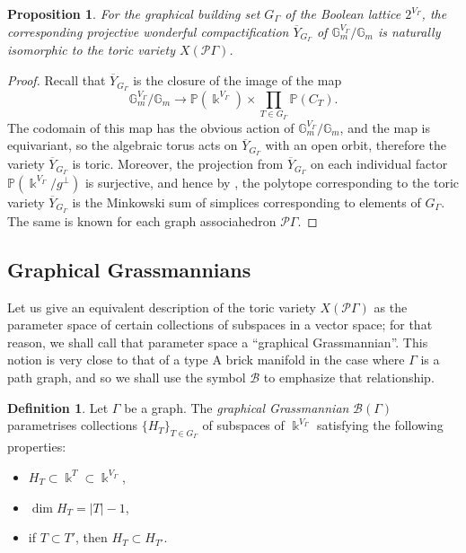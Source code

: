 \documentclass[11pt]{article}
\newtheorem{prop}[theo]{Proposition}
\theoremstyle{definition}
\newtheorem{defi}[theo]{Definition}
\numberwithin{equation}{section}
\newcommand\calB{\mathcal{B}}
\newcommand\calP{\mathcal{P}}
\newcommand\kk{\Bbbk}
\begin{document}
\begin{prop}\label{prop:wondtoric}
For the graphical building set $G_\Gamma$ of the Boolean lattice $2^{V_\Gamma}$, the corresponding projective wonderful compactification  $\overline{Y}_{G_\Gamma}$ of $\mathbb{G}_m^{V_\Gamma}/\mathbb{G}_m$ is naturally isomorphic to the toric variety $X(\calP\Gamma)$.
\end{prop}

\begin{proof}
Recall that $\overline{Y}_{G_\Gamma}$ is the closure of the image of the map
 \[
\mathbb{G}_m^{V_\Gamma}/\mathbb{G}_m\to\mathbb{P}(\kk^{V_\Gamma})\times\prod_{T\in G_\Gamma} \mathbb{P}(C_T).
 \]
The codomain of this map has the obvious action of $\mathbb{G}_m^{V_\Gamma}/\mathbb{G}_m$, and the map is equivariant, so the algebraic torus acts on $\overline{Y}_{G_\Gamma}$ with an open orbit, therefore the variety $\overline{Y}_{G_\Gamma}$ is toric. Moreover, the projection from $\overline{Y}_{G_\Gamma}$ on each individual factor $\mathbb{P}(\kk^{V_\Gamma}/g^\bot)$ is surjective, and hence by \cite[Prop.~8.1.4]{MR2394437}, the polytope corresponding to the toric variety $\overline{Y}_{G_\Gamma}$ is the Minkowski sum of simplices corresponding to elements of $G_\Gamma$. The same is known \cite{MR2487491} for each graph associahedron $\calP\Gamma$. 
\end{proof}

\subsection{Graphical Grassmannians}

Let us give an equivalent description of the toric variety $X(\calP\Gamma)$ as the parameter space of certain collections of subspaces in a vector space; for that reason, we shall call that parameter space a ``graphical Grassmannian''. This notion is very close to that of a type A brick manifold \cite{MR4072173,MR3512647} in the case where $\Gamma$ is a path graph, and so we shall use the symbol $\calB$ to emphasize that relationship.

\begin{defi}
Let $\Gamma$ be a graph. The \emph{graphical Grassmannian} $\calB(\Gamma)$ parametrises collections $\{H_T\}_{T\in G_\Gamma}$ of subspaces of $\kk^{V_\Gamma}$ satisfying the following properties:
\begin{itemize}
\item $H_T\subset \kk^{T}\subset \kk^{V_\Gamma}$,
\item $\dim H_T=|T|-1$,
\item if $T\subset T'$, then $H_T\subset H_{T'}$.
\end{itemize}
\end{defi}
\end{document}
